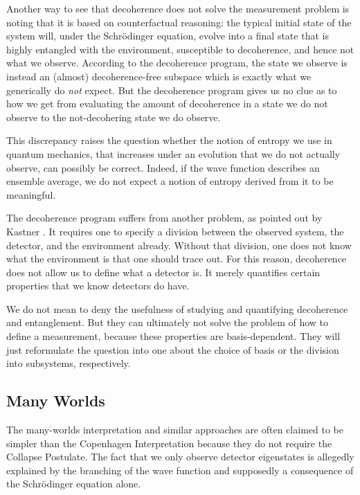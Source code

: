 \documentclass[superscriptaddress,floatfix,nofootinbib,12pt]{revtex4-2}
\begin{document}
Another way to see that decoherence does not solve the measurement problem is noting that it is based on counterfactual reasoning: the typical initial state of the system will, under the Schr\"odinger equation, evolve into a final state that is highly entangled with the environment, susceptible to decoherence, and hence not what we observe. According to the decoherence program, the state we observe is instead an (almost) decoherence-free subspace which is exactly what we generically do \emph{not} expect. But the decoherence program gives us no clue as to how we get from evaluating the amount of decoherence in a state we do not observe to the not-decohering state we do observe. 

This discrepancy raises the question whether the notion of entropy we use in quantum mechanics, that increases under an evolution that we do not actually observe, can possibly be correct. Indeed, if the wave function describes an ensemble average, we do not expect a notion of entropy derived from it to be meaningful. 

The decoherence program suffers from another problem, as pointed out by Kastner \cite{Kastner2014Einselection}. It requires one to specify a division between the observed system, the detector, and the environment already. Without that division, one does not know what the environment is that one should trace out. For this reason, decoherence does not allow us to define what a detector is. It merely quantifies certain properties that we know detectors do have. 

We do not mean to deny the usefulness of studying and quantifying decoherence and entanglement. But they can ultimately not solve the problem of how to define a measurement, because these properties are basis-dependent. They will just reformulate the question into one about the choice of basis or the division into subsystems, respectively.

\subsection{Many Worlds} 

The many-worlds interpretation \cite{everett1957relative,dewitt2015many} and similar approaches are often claimed to be simpler than the Copenhagen Interpretation \cite{Faye2019SEPCopenhagen} because they do not require the Collapse Postulate. The fact that we only observe detector eigenstates is allegedly explained by the branching of the wave function and supposedly a consequence of the Schr\"odinger equation alone.
\end{document}
